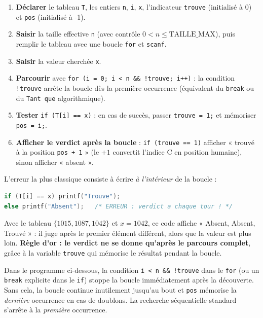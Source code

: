 \documentclass[11pt]{article}
\begin{document}
\begin{methode}
\begin{enumerate}
\item \textbf{Déclarer} le tableau \texttt{T}, les entiers \texttt{n}, \texttt{i}, \texttt{x}, l'indicateur \texttt{trouve} (initialisé à 0) et \texttt{pos} (initialisé à -1).
\item \textbf{Saisir} la taille effective \texttt{n} (avec contrôle $0 < n \le \text{TAILLE\_MAX}$), puis remplir le tableau avec une boucle \texttt{for} et \texttt{scanf}.
\item \textbf{Saisir} la valeur cherchée \texttt{x}.
\item \textbf{Parcourir} avec \texttt{for (i = 0; i < n \&\& !trouve; i++)} : la condition \texttt{!trouve} arrête la boucle dès la première occurrence (équivalent du \texttt{break} ou du \texttt{Tant que} algorithmique).
\item \textbf{Tester} \texttt{if (T[i] == x)} : en cas de succès, passer \texttt{trouve = 1;} et mémoriser \texttt{pos = i;}.
\item \textbf{Afficher le verdict après la boucle} : \texttt{if (trouve == 1)} afficher « trouvé à la position \texttt{pos + 1} » (le $+1$ convertit l'indice C en position humaine), sinon afficher « absent ».
\end{enumerate}
\end{methode}

\begin{attention}
L'erreur la plus classique consiste à écrire \emph{à l'intérieur} de la boucle :
\begin{lstlisting}[language=C]
if (T[i] == x) printf("Trouve");
else printf("Absent");   /* ERREUR : verdict a chaque tour ! */
\end{lstlisting}
Avec le tableau $\{1015, 1087, 1042\}$ et $x = 1042$, ce code affiche « Absent, Absent, Trouvé » : il juge après le premier élément différent, alors que la valeur est plus loin. \textbf{Règle d'or : le verdict ne se donne qu'après le parcours complet}, grâce à la variable \texttt{trouve} qui mémorise le résultat pendant la boucle.
\end{attention}

\begin{attention}
Dans le programme ci-dessous, la condition \texttt{i < n \&\& !trouve} dans le \texttt{for} (ou un \texttt{break} explicite dans le \texttt{if}) stoppe la boucle immédiatement après la découverte. Sans cela, la boucle continue inutilement jusqu'au bout et \texttt{pos} mémorise la \emph{dernière} occurrence en cas de doublons. La recherche séquentielle standard s'arrête à la \emph{première} occurrence.
\end{attention}
\end{document}
